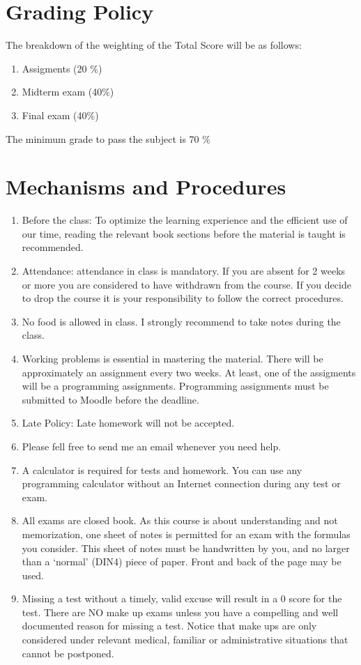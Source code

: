 \documentclass[12pt]{article}
\begin{document}

\section*{Grading Policy}

The breakdown of the weighting of the Total Score will be as follows:

\begin{enumerate}
\item  	Assigments (20 $\%$)
\item   Midterm exam (40$\%$)
\item 	Final exam (40$\%$)

\end{enumerate}

The minimum grade to pass the subject is 70 \% 


\section*{Mechanisms and Procedures}

\begin{enumerate}
\item Before the class: To optimize the learning experience and the efficient use of our time, reading the relevant book sections before the material is taught
 is recommended. 
\item Attendance:  attendance in class is mandatory. If you are absent for 2 weeks or more you are considered to have withdrawn from the course. If you decide to
 drop the course it is your responsibility to follow the correct procedures.
\item No food is allowed in class. I strongly recommend to take notes during the class.
\item Working problems is essential in mastering the material. There will be approximately an assignment every two weeks.  At least, one of the assigments will be a 
programming assignments. Programming assignments must be submitted to Moodle before the deadline.
\item Late Policy: Late homework will not be accepted.
\item  Please fell free to send me an email whenever you need help.
\item A calculator is required for tests and homework. You can use any programming calculator without an Internet connection during any test or exam.
\item All exams are closed book. As this course is about understanding and not memorization, one sheet of notes is permitted for an exam with the formulas you 
consider. This sheet of notes must be handwritten by you, and no larger than a ‘normal’ (DIN4) piece of paper. Front and back of the page may be used.
\item Missing a test without a timely, valid excuse will result in a 0 score for the test. There are NO make up exams unless you have a compelling and well 
documented reason for missing a test. Notice that make ups are only considered under relevant medical, familiar or administrative situations that cannot be 
postponed.
\end{enumerate}
\end{document}
